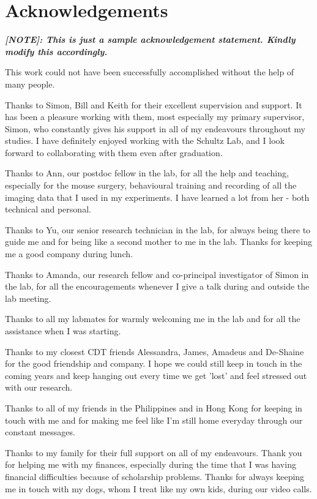 \documentclass[a4paper, twoside]{report}
\begin{document}

\section*{Acknowledgements} \large

\textbf{\textit{[NOTE]: This is just a sample acknowledgement statement. Kindly modify this accordingly.}}

This work could not have been successfully accomplished without the help of many people.

Thanks to Simon, Bill and Keith for their excellent supervision and support. It has been a pleasure working with them, most especially my primary supervisor, Simon, who constantly gives his support in all of my endeavours throughout my studies. I have definitely enjoyed working with the Schultz Lab, and I look forward to collaborating with them even after graduation.

Thanks to Ann, our postdoc fellow in the lab, for all the help and teaching, especially for the mouse surgery, behavioural training and recording of all the imaging data that I used in my experiments. I have learned a lot from her - both technical and personal. 

Thanks to Yu, our senior research technician in the lab, for always being there to guide me and for being like a second mother to me in the lab. Thanks for keeping me a good company during lunch. 

Thanks to Amanda, our research fellow and co-principal investigator of Simon in the lab, for all the encouragements whenever I give a talk during and outside the lab meeting.

Thanks to all my labmates for warmly welcoming me in the lab and for all the assistance when I was starting. 

Thanks to my closest CDT friends Alessandra, James, Amadeus and De-Shaine for the good friendship and company. I hope we could still keep in touch in the coming years and keep hanging out every time we get 'lost' and feel stressed out with our research.

Thanks to all of my friends in the Philippines and in Hong Kong for keeping in touch with me and for making me feel like I'm still home everyday through our constant messages.

Thanks to my family for their full support on all of my endeavours. Thank you for helping me with my finances, especially during the time that I was having financial difficulties because of scholarship problems. Thanks for always keeping me in touch with my dogs, whom I treat like my own kids, during our video calls.  
\end{document}
